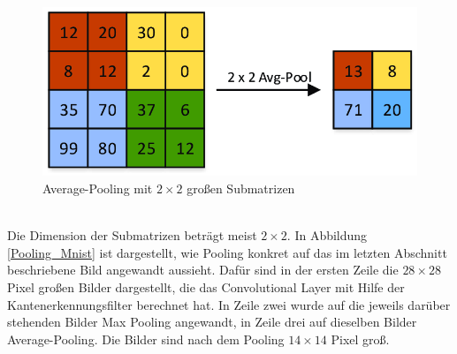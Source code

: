 \documentclass[11pt]{article}
\begin{document}
\begin{figure}[h]
	\centering
	\includegraphics[width=0.7\linewidth]{../graphics/Average-Pooling-Example.png}
	\caption[Average-Pooling mit $2\times2$ großen Submatrizen\newline
	Aus: Dominguez-Morales, Juan Pedro. (2018). Neuromorphic audio processing through real-time embedded spiking neural networks. Abbildung 33]{Average-Pooling mit $2\times2$ großen Submatrizen}
	\label{AvgPool}
\end{figure}
\\
Die Dimension der Submatrizen beträgt meist $2\times2$. In Abbildung \ref{Pooling_Mnist} ist dargestellt, wie Pooling konkret auf das im letzten Abschnitt beschriebene Bild angewandt aussieht. Dafür sind in der ersten Zeile die $28\times28$ Pixel großen Bilder dargestellt, die das Convolutional Layer mit Hilfe der Kantenerkennungsfilter berechnet hat. In Zeile zwei wurde auf die jeweils darüber stehenden Bilder Max Pooling angewandt, in Zeile drei auf dieselben Bilder Average-Pooling. Die Bilder sind nach dem Pooling $14\times14$ Pixel groß.
\end{document}
